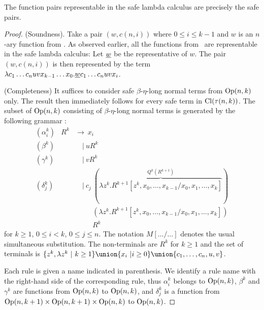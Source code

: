 \begin{theorem}
\label{thm:zaionc_pair_characterization_safe} The function pairs
representable in the safe lambda calculus are precisely the safe
pairs.
\end{theorem}

\begin{proof}
  (Soundness). Take a pair $(w,c(n,i))$ where
  $0\leq i\leq k-1$ and $w$ is an $n$-ary function from \safedefset.
  As observed earlier, all the functions from \safedefset\ are representable
  in the safe lambda calculus: Let $\underline{w}$ be the representative of $w$.
  The pair $(w,c(n,i))$ is then represented by the term
  $ \lambda c_1 \ldots c_n u v x_{k-1} \ldots x_0 . \underline{w} c_1\ldots c_n u v x_i$.
\smallskip

(Completeness) It suffices to consider safe $\beta$-$\eta$-long
normal terms from ${\rm Op}(n,k)$ only. The result then
immediately follows for every safe term in ${\rm Cl}(\tau(n,k))$. The
subset of ${\rm Op}(n,k)$ consisting of $\beta$-$\eta$-long
normal terms is generated by the following grammar \cite{DBLP:journals/tcs/Zaionc87}:
\begin{eqnarray*}
  (\alpha_i^k) &R^k &\rightarrow\ x_i \\
  (\beta^k) && \quad|\  u R^k \\
  (\gamma^k) && \quad|\  v R^k \\
  (\delta^k_j) && \quad|\  c_j\ (\overbrace{\lambda z^k. R^{k+1}[z^k,x_0,\ldots, x_{k-1}/x_0,x_1, \ldots, x_k]}^{Q^k(R^{k+1})}) \\
  && \quad\  \quad \ (\lambda z^k. R^{k+1}[z^k,x_0,\ldots, x_{k-1}/x_0,x_1, \ldots, x_k]) \\
  && \quad\  \quad \ R^k
\end{eqnarray*}
for $k\geq 1$, $0\leq i< k$, $0\leq j\leq n$. The notation $M[\ldots/\ldots]$ denotes the usual simultaneous substitution. The non-terminals are
$R^k$ for $k\geq1$ and the set of terminals is $\{ z^k, \lambda z^k
\ |\ k\geq 1\} \union \{ x_i ~| i\geq 0 \} \union \{ c_1, \ldots,
c_n, u, v \}$.

Each rule is given a name indicated in parenthesis. We identify a rule name with the right-hand side of the
corresponding rule, thus $\alpha_i^k$ belongs to ${\rm Op}(n,k)$,
$\beta^k$ and $\gamma^k$ are functions from ${\rm Op}(n,k)$ to
${\rm Op}(n,k)$, and $\delta^k_j$ is a function from
${\rm Op}(n,k+1) \times {\rm Op}(n,k+1) \times {\rm Op}(n,k)$
to ${\rm Op}(n,k)$.


\end{proof}

